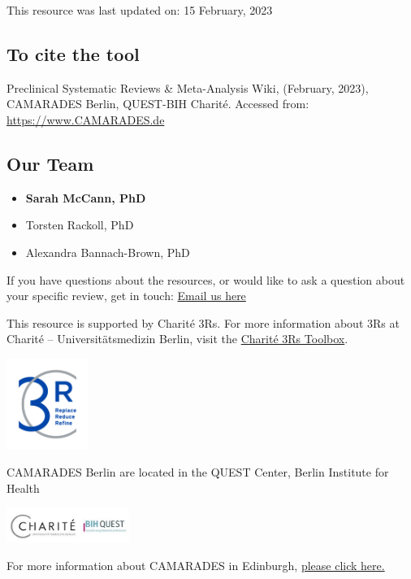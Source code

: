 \documentclass[
]{book}
\providecommand{\tightlist}{%
  \setlength{\itemsep}{0pt}\setlength{\parskip}{0pt}}
\begin{document}
This resource was last updated on: 15 February, 2023

\hypertarget{to-cite-the-tool}{%
\subsection{To cite the tool}\label{to-cite-the-tool}}

Preclinical Systematic Reviews \& Meta-Analysis Wiki, (February, 2023), CAMARADES Berlin, QUEST-BIH Charité. Accessed from: \url{https://www.CAMARADES.de}

\hypertarget{our-team}{%
\subsection{Our Team}\label{our-team}}

\begin{itemize}
\tightlist
\item
  \textbf{Sarah McCann, PhD}
\item
  Torsten Rackoll, PhD
\item
  Alexandra Bannach-Brown, PhD
\end{itemize}

If you have questions about the resources, or would like to ask a question about your specific review, get in touch: \href{mailto:CAMARADES.berlin@charite.de}{Email us here}

This resource is supported by Charité 3Rs. For more information about 3Rs at Charité -- Universitätsmedizin Berlin, visit the \href{https://charite3r.charite.de/en/charite_3r_toolbox/}{Charité 3Rs Toolbox}.

\includegraphics[width=0.2\textwidth,height=\textheight]{figs/C3R_Screen_Farbe.jpg}

CAMARADES Berlin are located in the QUEST Center, Berlin Institute for Health

\includegraphics[width=0.3\textwidth,height=\textheight]{charite-BIHquest.jpg}

For more information about CAMARADES in Edinburgh, \href{https://www.ed.ac.uk/clinical-brain-sciences/research/camarades}{please click here.}

  
\end{document}
